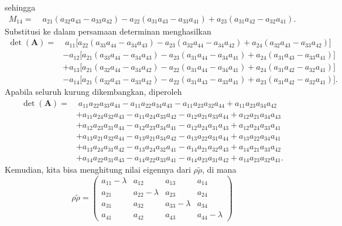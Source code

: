 sehingga
\begin{align}
	M_{14}
	=&\;
	a_{21}(a_{32}a_{43}-a_{33}a_{42})
	-a_{22}(a_{31}a_{43}-a_{33}a_{41})
	+a_{23}(a_{31}a_{42}-a_{32}a_{41}).
\end{align}
Substitusi ke dalam persamaan determinan menghasilkan
\begin{align}
	\det(\mathbf{A})
	=&\;
	a_{11}
	\Big[
	a_{22}(a_{33}a_{44}-a_{34}a_{43})
	-a_{23}(a_{32}a_{44}-a_{34}a_{42})
	+a_{24}(a_{32}a_{43}-a_{33}a_{42})
	\Big]
	\nonumber\\
	&
	-a_{12}
	\Big[
	a_{21}(a_{33}a_{44}-a_{34}a_{43})
	-a_{23}(a_{31}a_{44}-a_{34}a_{41})
	+a_{24}(a_{31}a_{43}-a_{33}a_{41})
	\Big]
	\nonumber\\
	&
	+a_{13}
	\Big[
	a_{21}(a_{32}a_{44}-a_{34}a_{42})
	-a_{22}(a_{31}a_{44}-a_{34}a_{41})
	+a_{24}(a_{31}a_{42}-a_{32}a_{41})
	\Big]
	\nonumber\\
	&
	-a_{14}
	\Big[
	a_{21}(a_{32}a_{43}-a_{33}a_{42})
	-a_{22}(a_{31}a_{43}-a_{33}a_{41})
	+a_{23}(a_{31}a_{42}-a_{32}a_{41})
	\Big].
\end{align}
Apabila seluruh kurung dikembangkan, diperoleh
\begin{align}
	\det(\mathbf{A})=&\;
	a_{11}a_{22}a_{33}a_{44}
	-a_{11}a_{22}a_{34}a_{43}
	-a_{11}a_{23}a_{32}a_{44}
	+a_{11}a_{23}a_{34}a_{42}
	\nonumber\\
	&
	+a_{11}a_{24}a_{32}a_{43}
	-a_{11}a_{24}a_{33}a_{42}
	-a_{12}a_{21}a_{33}a_{44}
	+a_{12}a_{21}a_{34}a_{43}
	\nonumber\\
	&
	+a_{12}a_{23}a_{31}a_{44}
	-a_{12}a_{23}a_{34}a_{41}
	-a_{12}a_{24}a_{31}a_{43}
	+a_{12}a_{24}a_{33}a_{41}
	\nonumber\\
	&
	+a_{13}a_{21}a_{32}a_{44}
	-a_{13}a_{21}a_{34}a_{42}
	-a_{13}a_{22}a_{31}a_{44}
	+a_{13}a_{22}a_{34}a_{41}
	\nonumber\\
	&
	+a_{13}a_{24}a_{31}a_{42}
	-a_{13}a_{24}a_{32}a_{41}
	-a_{14}a_{21}a_{32}a_{43}
	+a_{14}a_{21}a_{33}a_{42}
	\nonumber\\
	&
	+a_{14}a_{22}a_{31}a_{43}
	-a_{14}a_{22}a_{33}a_{41}
	-a_{14}a_{23}a_{31}a_{42}
	+a_{14}a_{23}a_{32}a_{41}.
\end{align}
Kemudian, kita bisa menghitung nilai eigennya dari $\rho \tilde{\rho}$, di mana
\begin{equation}
	\rho \tilde{\rho}=
	\begin{pmatrix}
		a_{11}-\lambda&a_{12}&a_{13}&a_{14}\\
		a_{21}&a_{22}-\lambda&a_{23}&a_{24}\\
		a_{31}&a_{32}&a_{33}-\lambda&a_{34}\\
		a_{41}&a_{42}&a_{43}&a_{44}-\lambda
	\end{pmatrix}
\end{equation}
